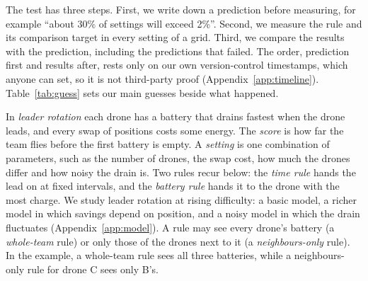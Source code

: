 \documentclass[11pt]{article}
\begin{document}
The test has three steps.
First, we write down a prediction before measuring, for example ``about 30\% of settings will exceed 2\%''.
Second, we measure the rule and its comparison target in every setting of a grid.
Third, we compare the results with the prediction, including the predictions that failed.
The order, prediction first and results after, rests only on our own version-control timestamps, which anyone can set, so it is not third-party proof (Appendix~\ref{app:timeline}).
Table~\ref{tab:guess} sets our main guesses beside what happened. 

In \emph{leader rotation} each drone has a battery that drains fastest when the drone leads, and every swap of positions costs some energy.
The \emph{score} is how far the team flies before the first battery is empty.
A \emph{setting} is one combination of parameters, such as the number of drones, the swap cost, how much the drones differ and how noisy the drain is.
Two rules recur below: the \emph{time rule} hands the lead on at fixed intervals, and the \emph{battery rule} hands it to the drone with the most charge.
We study leader rotation at rising difficulty: a basic model, a richer model in which savings depend on position, and a noisy model in which the drain fluctuates (Appendix~\ref{app:model}).
A rule may see every drone's battery (a \emph{whole-team} rule) or only those of the drones next to it (a \emph{neighbours-only} rule).
In the example, a whole-team rule sees all three batteries, while a neighbours-only rule for drone C sees only B's.
\end{document}
